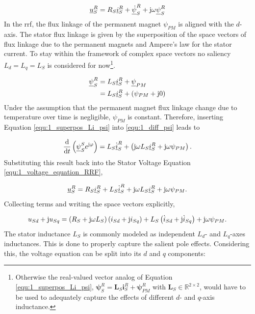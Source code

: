 \begin{equation}
	\underline{u}_S^R = R_S \underline{i}_S^R + \underline{\dot{\psi}}_S^R + \mathrm{j}  \omega \underline{\psi}_S^R
	\label{equ:1_voltage_equation_RRF}
\end{equation}
In the \acrshort{rrf}, the flux linkage of the permanent magnet $\psi_{PM}$ is aligned with
the $d$-axis. The stator flux linkage is given by the superposition of the space vectors of flux linkage due to the permanent magnets and Ampere's law for the stator current. To stay within the framework of complex space vectors no saliency $L_d = L_q = L_S$ is considered for now\footnote{Otherwise the real-valued vector analog of Equation \eqref{equ:1_superpos_Li_psi}, $\bm{\psi}_S^R = \bm{L}_S \bm{i}_S^R + \bm{\psi}_{PM}^R$ with $\bm{L}_S \in \mathbb{R}^{2\times2}$, would have to be used to adequately capture the effects of different $d$- and $q$-axis inductance.}. 

\begin{equation}
    \begin{split}
        \underline{\psi}_S^R
        &=
        L_S\underline{i}_S^R
        +
        \underline{\psi}_{PM}\\
        &=
        L_S\underline{i}_S^R
        +
        \left(
        \psi_{PM}+\mathrm{j} 0
        \right)
    \end{split}
    \label{equ:1_superpos_Li_psi}
\end{equation}
Under the assumption that the permanent magnet flux linkage change due to temperature over time is negligible, $\psi_{PM}$ is constant. Therefore, inserting Equation \eqref{equ:1_superpos_Li_psi} into \eqref{equ:1_diff_psi} leads to

\[
\frac{\mathrm{d}}{\mathrm{d} t}
\left(
\underline{\psi}_S^S e^{\mathrm{j} \varphi}
\right)
=
L_S\dot{\underline{i}}_S^R
+
\left(
\mathrm{j} \omega L_S\underline{i}_S^R
+
\mathrm{j} \omega\psi_{PM}
\right).
\]
Substituting this result back into the Stator Voltage Equation \eqref{equ:1_voltage_equation_RRF},

\[
\underline{u}_S^R
=
R_S\underline{i}_S^R
+
L_S\dot{\underline{i}}_S^R
+
\mathrm{j} \omega L_S\underline{i}_S^R
+
\mathrm{j} \omega\psi_{PM}.
\]
Collecting terms and writing the space vectors explicitly,

\[
u_{Sd}+\mathrm{j} u_{Sq}
=
\left(
R_S+\mathrm{j} \omega L_S
\right)
\left(
i_{Sd}+\mathrm{j} i_{Sq}
\right)
+
L_S
\left(
\dot{i}_{Sd}+\mathrm{j} \dot{i}_{Sq}
\right)
+
\mathrm{j} \omega\psi_{PM}.
\]
The stator inductance $L_S$ is commonly modeled as independent $L_d$- and $L_q$-axes inductances. This is done  to properly capture the salient pole effects. Considering this, the voltage equation can be split into its $d$ and $q$ components:

